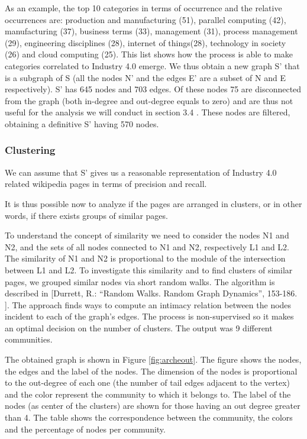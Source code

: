 \documentclass[]{book}
\begin{document}
As an example, the top 10 categories in terms of occurrence and the
relative occurrences are: production and manufacturing (51), parallel
computing (42), manufacturing (37), business terms (33), management
(31), process management (29), engineering disciplines (28), internet of
things(28), technology in society (26) and cloud computing (25). This
list shows how the process is able to make categories correlated to
Industry 4.0 emerge. We thus obtain a new graph S' that is a subgraph of
S (all the nodes N' and the edges E' are a subset of N and E
respectively). S' has 645 nodes and 703 edges. Of these nodes 75 are
disconnected from the graph (both in-degree and out-degree equals to
zero) and are thus not useful for the analysis we will conduct in
section 3.4 . These nodes are filtered, obtaining a definitive S' having
570 nodes.

\subsubsection*{Clustering}\label{clustering-2}

We can assume that S' gives us a reasonable representation of Industry
4.0 related wikipedia pages in terms of precision and recall.

It is thus possible now to analyze if the pages are arranged in
clusters, or in other words, if there exists groups of similar pages.

To understand the concept of similarity we need to consider the nodes N1
and N2, and the sets of all nodes connected to N1 and N2, respectively
L1 and L2. The similarity of N1 and N2 is proportional to the module of
the intersection between L1 and L2. To investigate this similarity and
to find clusters of similar pages, we grouped similar nodes via short
random walks. The algorithm is described in {[}Durrett, R.: ``Random
Walks. Random Graph Dynamics'', 153-186. {]}. The approach finds ways to
compute an intimacy relation between the nodes incident to each of the
graph's edges. The process is non-supervised so it makes an optimal
decision on the number of clusters. The output was 9 different
communities.

The obtained graph is shown in Figure \ref{fig:archeout}. The figure
shows the nodes, the edges and the label of the nodes. The dimension of
the nodes is proportional to the out-degree of each one (the number of
tail edges adjacent to the vertex) and the color represent the community
to which it belongs to. The label of the nodes (as center of the
clusters) are shown for those having an out degree greater than 4. The
table shows the correspondence between the community, the colors and the
percentage of nodes per community.
\end{document}
